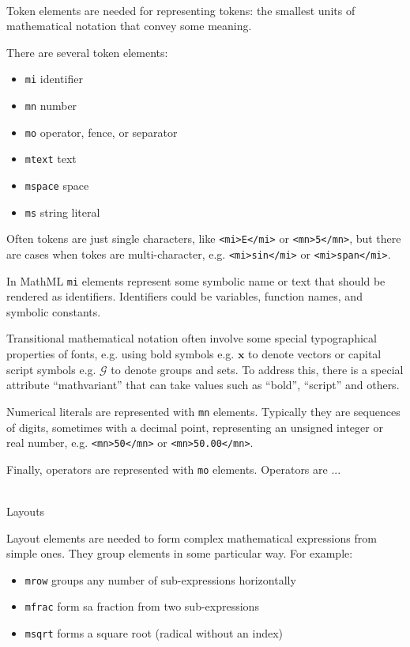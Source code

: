 \ \\

Token elements are needed for representing tokens: the smallest units of
mathematical notation that convey some meaning.

There are several token elements:

\begin{itemize}
\itemsep1pt\parskip0pt
\item
  \texttt{mi} identifier
\item
  \texttt{mn} number
\item
  \texttt{mo} operator, fence, or separator
\item
  \texttt{mtext} text
\item
  \texttt{mspace} space
\item
  \texttt{ms} string literal
\end{itemize}

Often tokens are just single characters, like
\texttt{<mi>E</mi>} or
\texttt{<mn>5</mn>}, but
there are cases when tokes are multi-character, e.g.
\texttt{<mi>sin</mi>} or
\texttt{<mi>span</mi>}.

In MathML \texttt{mi} elements represent some symbolic name or text that
should be rendered as identifiers. Identifiers could be variables,
function names, and symbolic constants.

Transitional mathematical notation often involve some special
typographical properties of fonts, e.g. using bold symbols e.g.
$\mathbf x$ to denote vectors or capital script symbols
e.g. $\mathcal G$ to denote groups and sets. To address
this, there is a special attribute ``mathvariant'' that can take values
such as ``bold'', ``script'' and others.

Numerical literals are represented with \texttt{mn} elements. Typically
they are sequences of digits, sometimes with a decimal point,
representing an unsigned integer or real number, e.g.
\texttt{<mn>50</mn>} or
\texttt{<mn>50.00</mn>}.

Finally, operators are represented with \texttt{mo} elements. Operators
are ...


\ \\

Layouts

Layout elements are needed to form complex mathematical expressions from
simple ones. They group elements in some particular way. For example:

\begin{itemize}
\itemsep1pt\parskip0pt
\item
  \texttt{mrow} groups any number of sub-expressions horizontally
\item
  \texttt{mfrac} form sa fraction from two sub-expressions
\item
  \texttt{msqrt} forms a square root (radical without an index)
\end{itemize}

